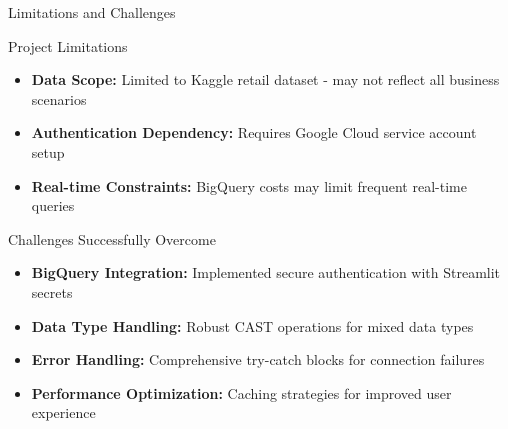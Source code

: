 \documentclass[aspectratio=169]{beamer}
\begin{document}
\begin{frame}{Limitations and Challenges}
\begin{alertblock}{Project Limitations}
\begin{itemize}
    \item \textbf{Data Scope:} Limited to Kaggle retail dataset - may not reflect all business scenarios
    \item \textbf{Authentication Dependency:} Requires Google Cloud service account setup
    \item \textbf{Real-time Constraints:} BigQuery costs may limit frequent real-time queries
\end{itemize}
\end{alertblock}

\vspace{0.5cm}

\begin{block}{Challenges Successfully Overcome}
\begin{itemize}
    \item \textbf{BigQuery Integration:} Implemented secure authentication with Streamlit secrets
    \item \textbf{Data Type Handling:} Robust CAST operations for mixed data types
    \item \textbf{Error Handling:} Comprehensive try-catch blocks for connection failures
    \item \textbf{Performance Optimization:} Caching strategies for improved user experience
\end{itemize}
\end{block}
\end{frame}
\end{document}
